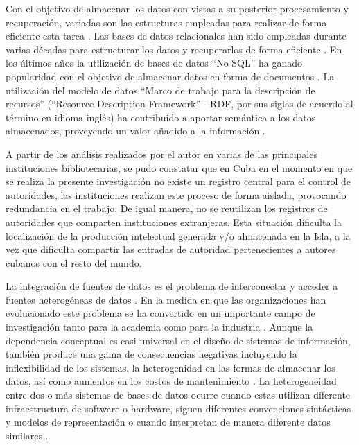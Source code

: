 Con el objetivo de almacenar los datos con vistas a su posterior procesamiento y recuperación, variadas son las estructuras empleadas para realizar de forma eficiente esta tarea \citep{Gutierrez2011,Vavliakis2013,Lacasta2013}. Las bases de datos relacionales han sido empleadas durante varias décadas para estructurar los datos y recuperarlos de forma eficiente \citep{maier1983theory,Shanmugasundaram1999,Ilyas2004,Spanos2012}. En los últimos años la utilización de bases de datos ``No-SQL'' ha ganado popularidad con el objetivo de almacenar datos en forma de documentos \citep{Pokorny2013,Moniruzzaman2013}. La utilización del modelo de datos ``Marco de trabajo para la descripción de recursos'' (``Resource Description Framework'' - RDF, por sus siglas de acuerdo al término en idioma inglés) ha contribuido a aportar semántica a los datos almacenados, proveyendo un valor añadido a la información \citep{Berners-Lee2001,Konstantinou2014,Sule2016}.

A partir de los análisis realizados por el autor en varias de las principales instituciones bibliotecarias, se pudo constatar que en Cuba en el momento en que se realiza la presente investigación no existe un registro central para el control de autoridades, las instituciones realizan este proceso de forma aislada, provocando redundancia en el trabajo. De igual manera, no se reutilizan los registros de autoridades que comparten instituciones extranjeras. Esta situación dificulta la localización de la producción intelectual generada y/o almacenada en la Isla, a la vez que dificulta compartir las entradas de autoridad pertenecientes a autores cubanos con el resto del mundo.

La integración de fuentes de datos es el problema de interconectar y acceder a fuentes heterogéneas de datos \citep{Nachouki2011}. En la medida en que las organizaciones han evolucionado este problema se ha convertido en un importante campo de investigación tanto para la academia como para la industria \citep{Nachouki2011}. Aunque la dependencia conceptual es casi universal en el diseño de sistemas de información, también produce una gama de consecuencias negativas incluyendo la inflexibilidad de los sistemas, la heterogenidad en las formas de almacenar los datos, así como aumentos en los costos de mantenimiento \citep{McGinnes2015}. La heterogeneidad entre dos o más sistemas de bases de datos ocurre cuando estas utilizan diferente infraestructura de software o hardware, siguen diferentes convenciones sintácticas y modelos de representación o cuando interpretan de manera diferente datos similares \citep{Spanos2012}.

